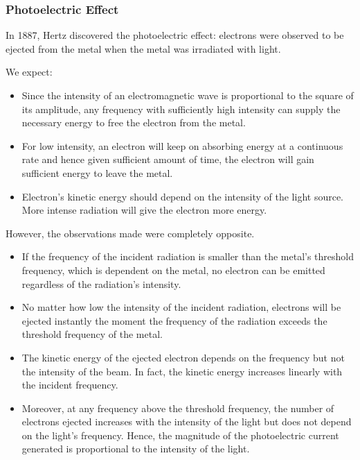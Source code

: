 \documentclass[a4paper]{article}
\begin{document}
\subsubsection*{Photoelectric Effect}
\begin{defi}
In 1887, Hertz discovered the photoelectric effect: electrons were observed to be ejected from the metal when the metal was irradiated with light.
\end{defi}
\begin{Note}
We expect:
\begin{itemize}
\item Since the intensity of an electromagnetic wave is proportional to the square of its amplitude, any frequency with sufficiently high intensity can supply the necessary energy to free the electron from the metal.
\item For low intensity, an electron will keep on absorbing energy at a continuous rate and hence given sufficient amount of time, the electron will gain sufficient energy to leave the metal.
\item Electron's kinetic energy should depend on the intensity of the light source. More intense radiation will give the electron more energy.
\end{itemize}
However, the observations made were completely opposite.
\begin{itemize}
\item If the frequency of the incident radiation is smaller than the metal's threshold frequency, which is dependent on the metal, no electron can be emitted regardless of the radiation's intensity.
\item No matter how low the intensity of the incident radiation, electrons will be ejected instantly the moment the frequency of the radiation exceeds the threshold frequency of the metal.
\item The kinetic energy of the ejected electron depends on the frequency but not the intensity of the beam. In fact, the kinetic energy increases linearly with the incident frequency.
\item Moreover, at any frequency above the threshold frequency, the number of electrons ejected increases with the intensity of the light but does not depend on the light's frequency. Hence, the magnitude of the photoelectric current generated is proportional to the intensity of the light.
\end{itemize} 
\end{Note}
\end{document}
